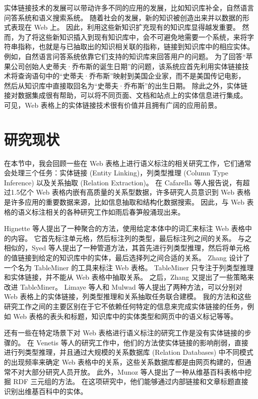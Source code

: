 实体链接技术的发展可以带动许多不同的应用的发展，比如知识库补全，自然语言问答系统和语义搜索系统。
随着社会的发展，新的知识被创造出来并以数据的形式表现在 Web 上。
因此，利用这些新知识扩充现有的知识库显得越发重要。
然而，为了将这些新知识插入到现有知识库中，会不可避免地需要一个系统，来将字符串指称，也就是与已抽取出的知识相关联的指称，链接到知识库中的相应实体。
例如，自然语言问答系统依靠它们支持的知识库来回答用户的问题。
为了回答``苹果公司创始人史蒂夫·乔布斯的诞生日期''的问题，该系统应首先利用实体链接技术将查询语句中的``史蒂夫·乔布斯''映射到美国企业家，而不是美国传记电影，
然后从知识库中直接取回名为``史蒂夫·乔布斯''的出生日期。
除此之外，实体链接对数据集成很有帮助，可以将不同页面、文档和站点上的实体信息进行集成。
可见，Web 表格上的实体链接技术很有价值并且拥有广阔的应用前景。\par


\section{研究现状}

在本节中，我会回顾一些在 Web 表格上进行语义标注的相关研究工作，它们通常会处理三个任务：实体链接 (Entity Linking)，列类型推理 (Column Type Inference) 以及关系抽取 (Relation Extraction)。 
在 Cafarella 等人\cite{cafarella2008webtables}报告说，有超过1.5亿个 Web 表格内嵌有高质量的关系型数据，许多研究人员意识到 Web 表格是许多应用的重要数据来源，比如信息抽取和结构化数据搜索。 
因此，与 Web 表格的语义标注相关的各种研究工作如雨后春笋般涌现出来。\par

Hignette 等人\cite{hignette2009fuzzy}提出了一种聚合的方法，使用给定本体中的词汇来标注 Web 表格中的内容。
它首先标注单元格，然后标注列的类型，最后标注列之间的关系。
与之相似的，Syed 等人\cite{syed2010exploiting}提出了一种管道方法，其首先进行列类型推理，然后将单元格的值链接到给定的知识库中的实体，最后选择列之间合适的关系。
Zhang \cite{zhang2014towards}设计了一个名为 TableMiner 的工具来标注 Web 表格。
TableMiner 只专注于列类型推理和实体链接，并不能从 Web 表格中抽取关系。
之后，Zhang \cite{zhang2014learning}又提出了一些策略来改进 TableMiner。 
Limaye 等人\cite{limaye2010annotating}和 Mulwad 等人\cite{mulwad2013semantic}提出了两种方法，可以分别对 Web 表格上的实体链接，列类型推理和关系抽取任务联合建模。
我的方法和这些研究工作之间的主要区别在于它不依赖任何特定的信息来完成实体链接的任务，例如 Web 表格的表头和标题，知识库中的实体类型和网页中的语义标记等等。\par

还有一些在特定场景下对 Web 表格进行语义标注的研究工作是没有实体链接的步骤的。
在 Venetis 等人\cite{venetis2011recovering}的研究工作中，他们的方法使实体链接的影响削弱，直接进行列类型推理，并且通过大规模的关系数据库 (Relation Databases) 中不同模式的出现频率来确定 Web 表格中的关系，这些关系数据库都是由网页构建的，但通常不对大部分研究人员开放。
此外，Munoz 等人\cite{munoz2014using}提出了一种从维基百科表格中挖掘 RDF 三元组的方法。
在这项研究中，他们能够通过内部链接和文章标题直接识别出维基百科中的实体。\par

